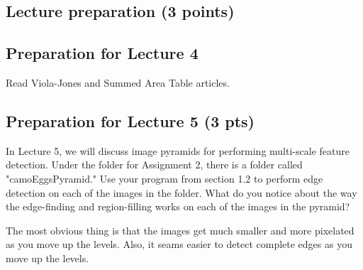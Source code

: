 \documentclass{article}
\begin{document}
\begin{enumerate}
\section{Lecture preparation (3 points)}

\subsection{Preparation for Lecture 4}
Read Viola-Jones and Summed Area Table articles.

\subsection{Preparation for Lecture 5 (3 pts)}
In Lecture 5, we will discuss image pyramids for performing multi-scale feature
detection. Under the folder for Assignment 2, there is a folder called "camoEggsPyramid." Use your program from section 1.2 to perform edge detection on each of the images in the folder. What do you notice about the way the edge-finding and region-filling works on each of the images in the pyramid?

The most obvious thing is that the images get much smaller and more pixelated as you move up the levels. Also, it seams easier to detect complete edges as you move up the levels.

\end{enumerate}
\end{document}
